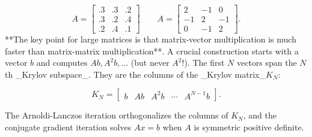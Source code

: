 \[A=\left[\begin{matrix}.3&.3&.2\\ .3&.2&.4\\ .2&.4&.1\end{matrix}\right]\qquad A=\left[\begin{matrix}2&-1&0\\ -1&2&-1\\ 0&-1&2\end{matrix}\right].\]
**The key point for large matrices is that matrix-vector multiplication is much faster than matrix-matrix multiplication**. A crucial construction starts with a vector \(b\) and computes \(Ab,A^{2}b,\ldots\) (but never \(A^{2}\)!). The first \(N\) vectors span the \(N\)th _Krylov subspace_. They are the columns of the _Krylov matrix_\(K_{N}\):

\[K_{N}=\left[\begin{matrix}b&Ab&A^{2}b&\cdots&A^{N-1}b\end{matrix}\right].\]

The Arnoldi-Lanczos iteration orthogonalizes the columns of \(K_{N}\), and the conjugate gradient iteration solves \(Ax=b\) when \(A\) is symmetric positive definite.

